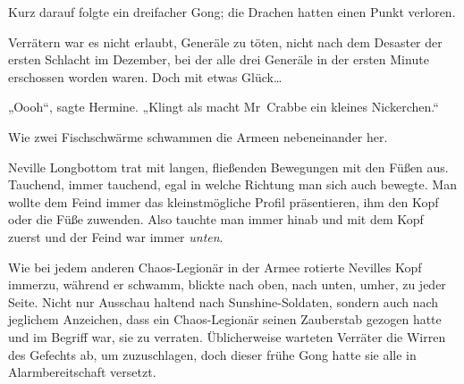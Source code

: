 Kurz darauf folgte ein dreifacher Gong; die Drachen hatten einen Punkt verloren.

Verrätern war es nicht erlaubt, Generäle zu töten, nicht nach dem Desaster der ersten Schlacht im Dezember, bei der alle drei Generäle in der ersten Minute erschossen worden waren. Doch mit etwas Glück…

„Oooh“, sagte Hermine. „Klingt als macht Mr~Crabbe ein kleines Nickerchen.“

\later

Wie zwei Fischschwärme schwammen die Armeen nebeneinander her.

Neville Longbottom trat mit langen, fließenden Bewegungen mit den Füßen aus. Tauchend, immer tauchend, egal in welche Richtung man sich auch bewegte. Man wollte dem Feind immer das kleinstmögliche Profil präsentieren, ihm den Kopf oder die Füße zuwenden. Also tauchte man immer hinab und mit dem Kopf zuerst und der Feind war immer \emph{unten}.

Wie bei jedem anderen Chaos-Legionär in der Armee rotierte Nevilles Kopf immerzu, während er schwamm, blickte nach oben, nach unten, umher, zu jeder Seite. Nicht nur Ausschau haltend nach Sunshine-Soldaten, sondern auch nach jeglichem Anzeichen, dass ein Chaos-Legionär seinen Zauberstab gezogen hatte und im Begriff war, sie zu verraten. Üblicherweise warteten Verräter die Wirren des Gefechts ab, um zuzuschlagen, doch dieser frühe Gong hatte sie alle in Alarmbereitschaft versetzt.

